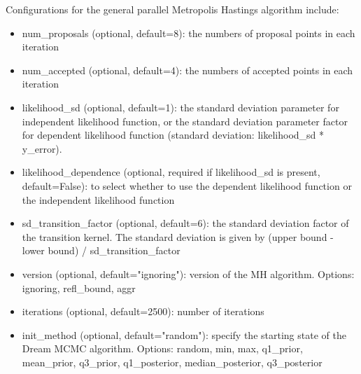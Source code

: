 Configurations for the general parallel Metropolis Hastings algorithm include:
\begin{itemize}
    \item num\_proposals (optional, default=8): the numbers of proposal points in each iteration
    \item num\_accepted (optional, default=4): the numbers of accepted points in each iteration
    \item likelihood\_sd (optional, default=1): the standard deviation parameter for independent likelihood function, or the standard deviation parameter factor for dependent likelihood function (standard deviation: likelihood\_sd * y\_error).
    \item likelihood\_dependence (optional, required if likelihood\_sd is present, default=False): to select whether to use the dependent likelihood function or the independent likelihood function
    \item sd\_transition\_factor (optional, default=6): the standard deviation factor of the transition kernel. The standard deviation is given by (upper bound - lower bound) / sd\_transition\_factor
    \item version (optional, default="ignoring"): version of the MH algorithm. Options: ignoring, refl\_bound, aggr
    \item iterations (optional, default=2500): number of iterations
    \item init\_method (optional, default="random"): specify the starting state of the Dream MCMC algorithm. Options: random, min, max, q1\_prior, mean\_prior, q3\_prior, q1\_posterior, median\_posterior, q3\_posterior
\end{itemize}

